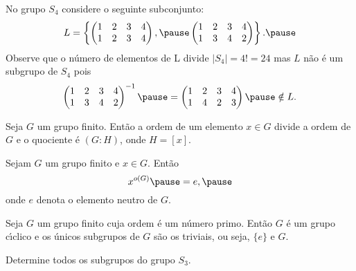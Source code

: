 \documentclass{beamer}
\begin{document}
    \begin{frame}
        \begin{observacao}
            No grupo $S_4$ \pause considere o seguinte subconjunto: \pause
            \[
                L = \left\{\begin{pmatrix}
                    1 & 2 & 3 & 4\\
                    1 & 2 & 3 & 4
                \end{pmatrix}, \pause \begin{pmatrix}
                    1 & 2 & 3 & 4\\
                    1 & 3 & 4 & 2
                \end{pmatrix}\right\}. \pause
            \]
            Observe que o n\'umero de elementos de L \pause divide $|S_4| = 4! = 24$ \pause mas $L$ n\~ao \'e um subgrupo de $S_4$ \pause pois
            \[
                \begin{pmatrix}
                    1 & 2 & 3 & 4\\
                    1 & 3 & 4 & 2
                \end{pmatrix}^{-1} \pause = \begin{pmatrix}
                    1 & 2 & 3 & 4\\
                    1 & 4 & 2 & 3
                \end{pmatrix} \pause \notin L.
            \]
        \end{observacao}
    \end{frame}

    \begin{frame}
        \begin{corolario}
            Seja $G$ um grupo finito. \pause Ent\~ao a ordem de um elemento $x \in G$ \pause divide a ordem de $G$ \pause e o quociente \'e $(G : H)$, \pause onde $H = [x]$.
        \end{corolario}
    \end{frame}

    \begin{frame}
        \begin{corolario}
            Sejam $G$ um grupo finito \pause e $x \in G$. \pause Ent\~ao
            \[
                x^{o(G)} \pause = e, \pause
            \]
            onde $e$ denota o elemento neutro de $G$.
        \end{corolario}
    \end{frame}

    \begin{frame}
        \begin{corolario}
            Seja $G$ um grupo finito \pause cuja ordem \'e um n\'umero primo. \pause Ent\~ao $G$ \'e um grupo c{\'\i}clico \pause e os \'unicos subgrupos de $G$ \pause s\~ao os triviais, \pause ou seja, $\{e\}$ e $G$.
        \end{corolario}
    \end{frame}

    \begin{frame}
        \begin{exemplo}
            Determine todos os subgrupos do grupo $S_3$.
        \end{exemplo}
    \end{frame}
\end{document}
